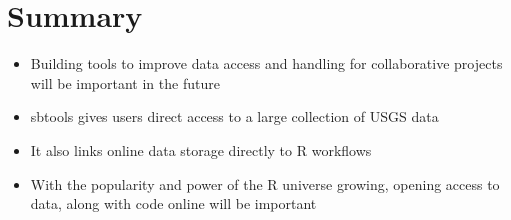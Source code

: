 \section{Summary}
\begin{itemize}
	\item{Building tools to improve data access and handling for collaborative projects will be important in the future}
	\item{sbtools gives users direct access to a large collection of USGS data}
	\item{It also links online data storage directly to R workflows}
	\item{With the popularity and power of the R universe growing, opening access to data, along with code online will be important}
\end{itemize}